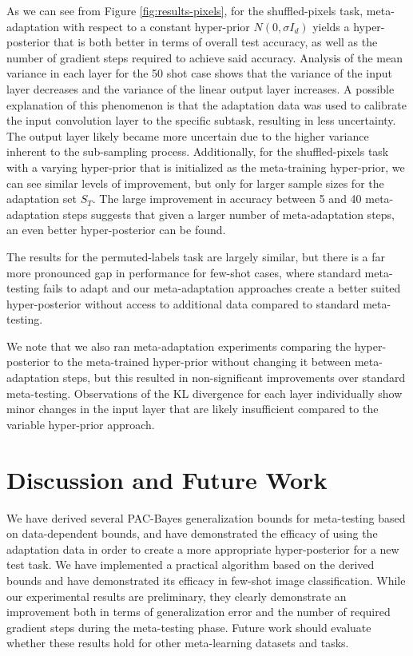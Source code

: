 \documentclass[letterpaper]{article} %
\theoremstyle{definition}
\begin{document}
As we can see from Figure \ref{fig:results-pixels}, for the shuffled-pixels task, meta-adaptation with respect to a constant hyper-prior $N(0,\sigma I_d)$ yields a hyper-posterior that is both better in terms of overall test accuracy, as well as the number of gradient steps required to achieve said accuracy. Analysis of the mean variance in each layer for the 50 shot case shows that the variance of the input layer decreases and the variance of the linear output layer increases.
A possible explanation of this phenomenon is that the adaptation data was used to calibrate the input convolution layer to the specific subtask, resulting in less uncertainty. The output layer likely became more uncertain due to the higher variance inherent to the sub-sampling process.
Additionally, for the shuffled-pixels task with a varying hyper-prior that is initialized as the meta-training hyper-prior, we can see similar levels of improvement, but only for larger sample sizes for the adaptation set $S_T$. The large improvement in accuracy between 5 and 40 meta-adaptation steps suggests that given a larger number of meta-adaptation steps, an even better hyper-posterior can be found.

The results for the permuted-labels task are largely similar, but there is a far more pronounced gap in performance for few-shot cases, where standard meta-testing fails to adapt and our meta-adaptation approaches create a better suited hyper-posterior without access to additional data compared to standard meta-testing.

We note that we also ran meta-adaptation experiments comparing the hyper-posterior to the meta-trained hyper-prior without changing it between meta-adaptation steps, but this resulted in non-significant improvements over standard meta-testing. Observations of the KL divergence for each layer individually show minor changes in the input layer that are likely insufficient compared to the variable hyper-prior approach.

\section{Discussion and Future Work}

We have derived several PAC-Bayes generalization bounds for meta-testing based on data-dependent bounds, and have demonstrated the efficacy of using the adaptation data in order to create a more appropriate hyper-posterior for a new test task.
We have implemented a practical algorithm based on the derived bounds and have demonstrated its efficacy in few-shot image classification.
While our experimental results are preliminary, they clearly demonstrate an improvement both in terms of generalization error and the number of required gradient steps during the meta-testing phase. Future work should evaluate whether these results hold for other meta-learning datasets and tasks.
\end{document}
